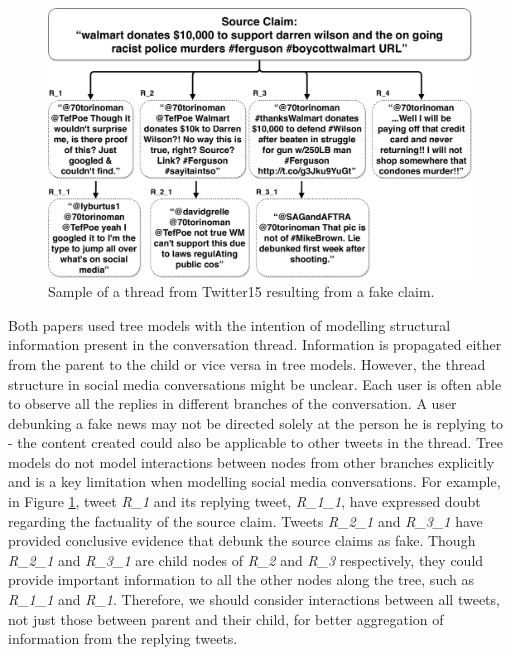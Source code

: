 \documentclass[letterpaper]{article} %
\begin{document}
\begin{figure}[t]
\centering
\includegraphics[width= 0.98\columnwidth]{prop_tree.pdf}
\caption{Sample of a thread from Twitter15 resulting from a fake claim.}
\label{fig:proptree}
\end{figure}

Both papers used tree models with the intention of modelling structural information present in the conversation thread. Information is propagated either from the parent to the child or vice versa in tree models. However, the thread structure in social media conversations might be unclear. Each user is often able to observe all the replies in different branches of the conversation. A user debunking a fake news may not be directed solely at the person he is replying to - the content created could also be applicable to other tweets in the thread. Tree models do not model interactions between nodes from other branches explicitly and is a key limitation when modelling social media conversations. For example, in Figure \ref{fig:proptree}, tweet \textit{R\_1} and its replying tweet, \textit{R\_1\_1}, have expressed doubt regarding the factuality of the source claim. Tweets \textit{R\_2\_1} and \textit{R\_3\_1} have provided conclusive evidence that debunk the source claims as fake. Though \textit{R\_2\_1} and \textit{R\_3\_1} are child nodes of \textit{R\_2} and \textit{R\_3} respectively, they could provide important information to all the other nodes along the tree, such as \textit{R\_1\_1} and \textit{R\_1}. Therefore, we should consider interactions between all tweets, not just those between parent and their child, for better aggregation of information from the replying tweets.
\end{document}
